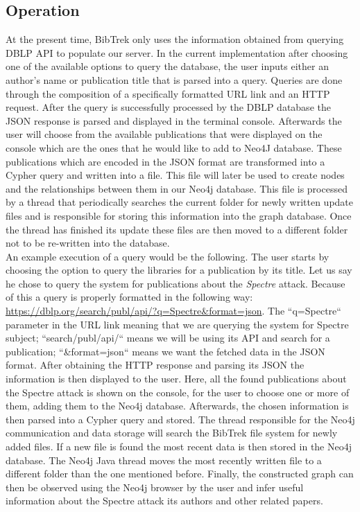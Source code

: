 \documentclass[twocolumn]{article}
\begin{document}
\subsection{Operation}
At the present time, BibTrek only uses the information obtained from querying DBLP API to populate our server. In the current implementation after choosing one of the available options to query the database, the user inputs either an author's name or publication title that is  parsed into a query. Queries are done through the composition of a specifically formatted URL link and an HTTP request. After the query is successfully processed by the DBLP database the JSON response is parsed and displayed in the terminal console. Afterwards the user will choose from the available publications that were displayed on the console which are the ones that he would like to add to Neo4J database. These publications which are encoded in the JSON format are transformed into a Cypher query and written into a file. This file will later be used to create nodes and the relationships between them in our Neo4j database. This file is processed by a thread that periodically searches the current folder for newly written update files and is responsible for storing this information into the graph database. Once the thread has finished its update these files are then moved to a different folder not to be re-written into the database. \\[1\baselineskip]
An example execution of a query would be the following. The user starts by choosing the option to query the libraries for a publication by its title. Let us say he chose to query the system for publications about the \emph{Spectre} attack. Because of this a query is properly formatted in the following way: \url{https://dblp.org/search/publ/api/?q=Spectre&format=json}. The ``q=Spectre`` parameter in the URL link meaning that we are querying the system for Spectre subject; ``search/publ/api/`` means we will be using its API and search for a publication; ``&format=json`` means we want the fetched data in the JSON format. After obtaining the HTTP response and parsing its JSON the information is then displayed to the user. Here, all the found publications about the Spectre attack is shown on the console, for the user to choose one or more of them, adding them to the Neo4j database. Afterwards, the chosen information is then parsed into a Cypher query and stored. The thread responsible for the Neo4j communication and data storage will search the BibTrek file system for newly added files. If a new file is found the most recent data is then stored in the Neo4j database. The Neo4j Java thread moves the most recently written file to a different folder than the one mentioned before. Finally, the constructed graph can then be observed using the Neo4j browser by the user and infer useful information about the Spectre attack its authors and other related papers.
\end{document}
